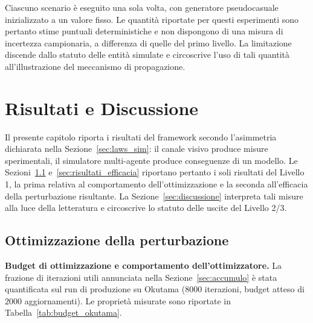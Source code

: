 \documentclass[a4paper,12pt]{report}
\begin{document}
Ciascuno scenario è eseguito una sola volta, con generatore pseudocasuale
inizializzato a un valore fisso. Le quantità riportate per questi esperimenti
sono pertanto stime puntuali deterministiche e non dispongono di una misura di
incertezza campionaria, a differenza di quelle del primo livello. La limitazione
discende dallo statuto delle entità simulate e circoscrive l'uso di tali
quantità all'illustrazione del meccanismo di propagazione.

\chapter{Risultati e Discussione}
\label{cap5}

Il presente capitolo riporta i risultati del framework secondo l'asimmetria dichiarata nella Sezione~\ref{sec:laws_sim}: il canale visivo produce misure sperimentali, il simulatore multi-agente produce conseguenze di un modello. Le Sezioni~\ref{sec:risultati_ottimizzazione} e~\ref{sec:risultati_efficacia} riportano pertanto i soli risultati del Livello 1, la prima relativa al comportamento dell'ottimizzazione e la seconda all'efficacia della perturbazione risultante. La Sezione~\ref{sec:discussione} interpreta tali misure alla luce della letteratura e circoscrive lo statuto delle uscite del Livello 2/3.

\section{Ottimizzazione della perturbazione}
\label{sec:risultati_ottimizzazione}

\textbf{Budget di ottimizzazione e comportamento dell'ottimizzatore.}
\label{sec:budget_effettivo}
La frazione di iterazioni utili annunciata nella Sezione~\ref{sec:accumulo} è stata quantificata sul run di produzione su Okutama ($8000$ iterazioni, budget atteso di $2000$ aggiornamenti). Le proprietà misurate sono riportate in Tabella~\ref{tab:budget_okutama}.
\end{document}
